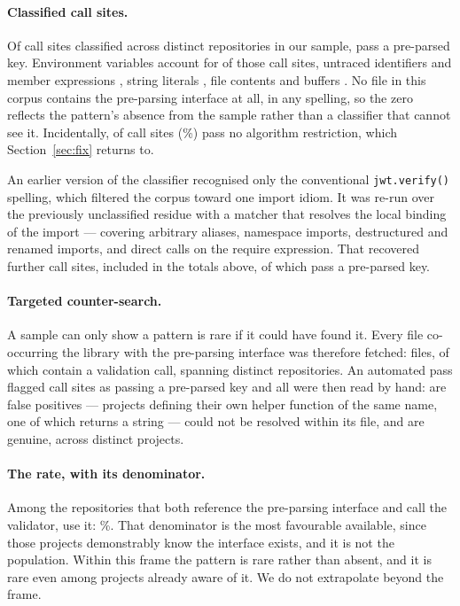 \documentclass[pdflatex,sn-basic,twocolumn]{sn-jnl}%
\begin{document}
\paragraph{Classified call sites.} Of \SampleCallSites{} call sites classified
across \SampleRepos{} distinct repositories in our sample,
\SampleSitesPreparsed{} pass a pre-parsed key. Environment variables account for
\SampleEnvString{} of those call sites, untraced identifiers and member
expressions \SampleUnknown{}, string literals \SampleStringLiteral{}, file
contents \SampleFileContents{} and buffers \SampleBuffer. No file in this corpus
contains the pre-parsing interface at all, in any spelling, so the zero reflects
the pattern's absence from the sample rather than a classifier that cannot see
it. Incidentally, \SampleNoAlgorithms{} of \SampleCallSites{} call sites
(\SampleNoAlgorithmsPct\%) pass no algorithm restriction, which
Section~\ref{sec:fix} returns to.

An earlier version of the classifier recognised only the conventional
\texttt{jwt.verify()} spelling, which filtered the corpus toward one import
idiom. It was re-run over the previously unclassified residue with a matcher that
resolves the local binding of the import --- covering arbitrary aliases,
namespace imports, destructured and renamed imports, and direct calls on the
require expression. That recovered \SampleRematchAdded{} further call sites,
included in the totals above, of which \RematchSitesPreparsed{} pass a pre-parsed
key.

\paragraph{Targeted counter-search.} A sample can only show a pattern is rare if
it could have found it. Every file co-occurring the library with the pre-parsing
interface was therefore fetched: \CounterFilesFetched{} files, of which
\CounterWithVerify{} contain a validation call, spanning
\CounterReposWithVerify{} distinct repositories. An automated pass flagged
\AdjudicatedTotal{} call sites as passing a pre-parsed key and all were then read
by hand: \AdjudicatedFalsePositive{} are false positives --- projects defining
their own helper function of the same name, one of which returns a string ---
\AdjudicatedUnresolved{} could not be resolved within its file, and
\AdjudicatedGenuine{} are genuine, across \AdjudicatedGenuineProjects{} distinct
projects.

\paragraph{The rate, with its denominator.} Among the \CounterReposWithVerify{}
repositories that both reference the pre-parsing interface and call the
validator, \AdjudicatedGenuineProjects{} use it: \AdjudicatedGenuinePct\%. That
denominator is the most favourable available, since those projects demonstrably
know the interface exists, and it is not the population. Within this frame the
pattern is rare rather than absent, and it is rare even among projects already
aware of it. We do not extrapolate beyond the frame.
\end{document}
